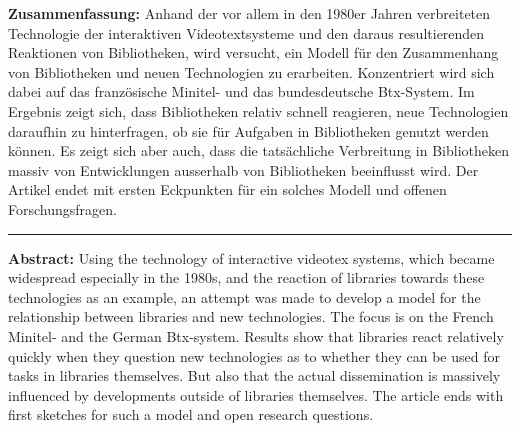 \textbf{Zusammenfassung:} Anhand der vor allem in den 1980er Jahren
verbreiteten Technologie der interaktiven Videotextsysteme und den
daraus resultierenden Reaktionen von Bibliotheken, wird versucht, ein
Modell für den Zusammenhang von Bibliotheken und neuen Technologien zu
erarbeiten. Konzentriert wird sich dabei auf das französische Minitel-
und das bundesdeutsche Btx-System. Im Ergebnis zeigt sich, dass
Bibliotheken relativ schnell reagieren, neue Technologien daraufhin zu
hinterfragen, ob sie für Aufgaben in Bibliotheken genutzt werden können.
Es zeigt sich aber auch, dass die tatsächliche Verbreitung in
Bibliotheken massiv von Entwicklungen ausserhalb von Bibliotheken
beeinflusst wird. Der Artikel endet mit ersten Eckpunkten für ein
solches Modell und offenen Forschungsfragen.

\begin{center}\rule{0.5\linewidth}{0.5pt}\end{center}

\textbf{Abstract:} Using the technology of interactive videotex systems,
which became widespread especially in the 1980s, and the reaction of
libraries towards these technologies as an example, an attempt was made
to develop a model for the relationship between libraries and new
technologies. The focus is on the French Minitel- and the German
Btx-system. Results show that libraries react relatively quickly when
they question new technologies as to whether they can be used for tasks
in libraries themselves. But also that the actual dissemination is
massively influenced by developments outside of libraries themselves.
The article ends with first sketches for such a model and open research
questions.
